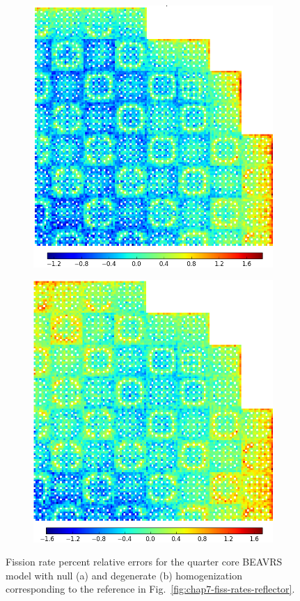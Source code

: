 \begin{figure}[h!]
\centering
\begin{subfigure}{\textwidth}
  \centering
  \includegraphics[width=0.6\linewidth]{figures/quantification/full-core/fiss-err-null}
  \caption{}
  \label{fig:chap8-full-core-fiss-err-null}
\end{subfigure}
\vspace{4mm}
\begin{subfigure}{\textwidth}
  \centering
  \includegraphics[width=0.6\linewidth]{figures/quantification/full-core/fiss-err-degenerate}
  \caption{}
  \label{fig:chap8-full-core-fiss-err-degenerate}
\end{subfigure}
\caption[Fission rate errors for BEAVRS]{Fission rate percent relative errors for the quarter core \ac{BEAVRS} model with null (a) and degenerate (b) homogenization corresponding to the reference in Fig.~\ref{fig:chap7-fiss-rates-reflector}.}
\label{fig:chap8-full-core-fiss-err}
\end{figure}

